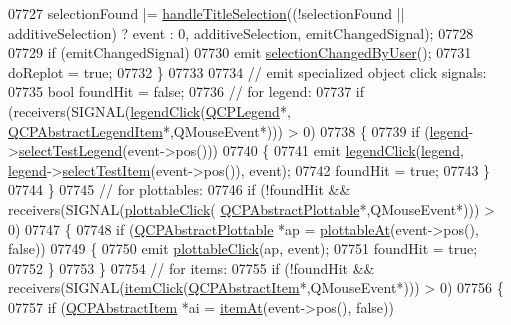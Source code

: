 \begin{DoxyCode}
07727         selectionFound |= \hyperlink{a00116_ae688ab743e775cd0c69941a082dd32e3}{handleTitleSelection}((!selectionFound || additiveSelection) ?
       \textcolor{keyword}{event} : 0, additiveSelection, emitChangedSignal);
07728       
07729       \textcolor{keywordflow}{if} (emitChangedSignal)
07730         emit \hyperlink{a00116_a500c64a109bc773c973ad274f2fa4190}{selectionChangedByUser}();
07731       doReplot = \textcolor{keyword}{true};
07732     \}
07733     
07734     \textcolor{comment}{// emit specialized object click signals:}
07735     \textcolor{keywordtype}{bool} foundHit = \textcolor{keyword}{false};
07736     \textcolor{comment}{// for legend:}
07737     \textcolor{keywordflow}{if} (receivers(SIGNAL(\hyperlink{a00116_a79cff0baafbca10a3aaf694d2d3b9ab3}{legendClick}(\hyperlink{a00045}{QCPLegend}*,
      \hyperlink{a00023}{QCPAbstractLegendItem}*,QMouseEvent*))) > 0)
07738     \{
07739       \textcolor{keywordflow}{if} (\hyperlink{a00116_a75acd427ec48e9a9d2ae6a17817cc490}{legend}->\hyperlink{a00045_a6388446e0906b21ebf3a92310570e73e}{selectTestLegend}(event->pos()))
07740       \{
07741         emit \hyperlink{a00116_a79cff0baafbca10a3aaf694d2d3b9ab3}{legendClick}(\hyperlink{a00116_a75acd427ec48e9a9d2ae6a17817cc490}{legend}, \hyperlink{a00116_a75acd427ec48e9a9d2ae6a17817cc490}{legend}->\hyperlink{a00045_a8bbb0b003cc93f07dff1d69416b606f0}{selectTestItem}(event->pos()),
       event);
07742         foundHit = \textcolor{keyword}{true};
07743       \}
07744     \}
07745     \textcolor{comment}{// for plottables:}
07746     \textcolor{keywordflow}{if} (!foundHit && receivers(SIGNAL(\hyperlink{a00116_a57e5efa8a854620e9bf62d31fc139f53}{plottableClick}(
      \hyperlink{a00024}{QCPAbstractPlottable}*,QMouseEvent*))) > 0)
07747     \{
07748       \textcolor{keywordflow}{if} (\hyperlink{a00024}{QCPAbstractPlottable} *ap = \hyperlink{a00116_ac1d1bc6ae4e13616fb02cef6d9e2188e}{plottableAt}(event->pos(), \textcolor{keyword}{false}))
07749       \{
07750         emit \hyperlink{a00116_a57e5efa8a854620e9bf62d31fc139f53}{plottableClick}(ap, event);
07751         foundHit = \textcolor{keyword}{true};
07752       \}
07753     \}
07754     \textcolor{comment}{// for items:}
07755     \textcolor{keywordflow}{if} (!foundHit && receivers(SIGNAL(\hyperlink{a00116_ae16b51f52d2b7aebbc7e3e74e6ff2e4b}{itemClick}(\hyperlink{a00022}{QCPAbstractItem}*,QMouseEvent*))) > 
      0)
07756     \{
07757       \textcolor{keywordflow}{if} (\hyperlink{a00022}{QCPAbstractItem} *ai = \hyperlink{a00116_a793e4b04e0ede11a733021907368fa83}{itemAt}(event->pos(), \textcolor{keyword}{false}))

\end{DoxyCode}
